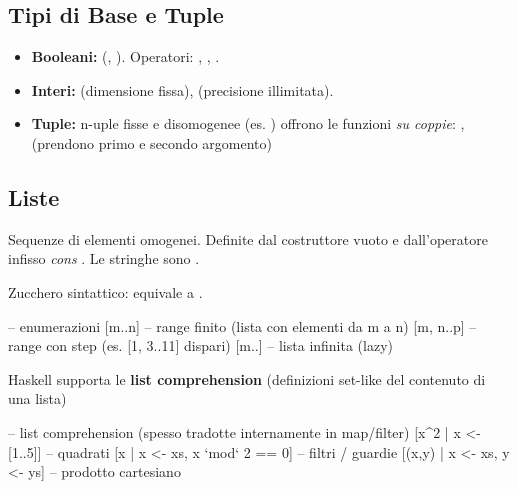 \documentclass[a4paper,11pt]{report}
\begin{document}
\subsection{Tipi di Base e Tuple}
\begin{itemize}
    \item \textbf{Booleani:}  (, ). Operatori: , \code{\&\&}, \code{||}.
    \item \textbf{Interi:}  (dimensione fissa),  (precisione illimitata).
    \item \textbf{Tuple:} n-uple fisse e disomogenee (es. )
        \subitem offrono le funzioni \textit{su coppie}: ,  (prendono primo e secondo argomento)
\end{itemize}

\subsection{Liste}
Sequenze di elementi omogenei. Definite dal costruttore vuoto \code{[]} e dall'operatore infisso \textit{cons} \code{(:)}. Le stringhe sono \code{[Char]}. 

Zucchero sintattico: \code{[1,2,3]} equivale a .

\begin{haskellbox}{}
-- enumerazioni 
[m..n]           -- range finito (lista con elementi da m a n)
[m, n..p]        -- range con step (es. [1, 3..11] dispari)
[m..]            -- lista infinita (lazy)

\end{haskellbox}
Haskell supporta le \textbf{list comprehension} (definizioni set-like del contenuto di una lista)

\begin{haskellbox}{}
-- list comprehension (spesso tradotte internamente in map/filter)
[x^2 | x <- [1..5]]               -- quadrati
[x | x <- xs, x `mod` 2 == 0]     -- filtri / guardie
[(x,y) | x <- xs, y <- ys]        -- prodotto cartesiano
\end{haskellbox}
\end{document}
